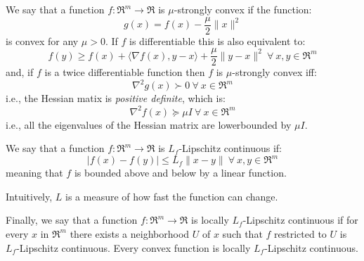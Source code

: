 
\begin{definition} \label{def:strong_convexity}
We say that a function $f: \Re^m \rightarrow \Re$ is $\mu$-strongly convex if the function:
$$
g(x) = f(x) - \frac{\mu}{2} \| x \|^2
$$
is convex for any $\mu > 0$. 
If $f$ is differentiable this is also equivalent to:
$$
f(y) \geq f(x) + \langle \nabla f(x), y - x \rangle + \frac{\mu}{2} \| y - x \|^2 \ \forall \ x, y \in \Re^m
$$
and, if $f$ is a twice differentiable function then $f$ is $\mu$-strongly convex iff:
$$
\nabla^2 g(x) \succ 0 \ \forall \ x \in \Re^m
$$
i.e., the Hessian matix is \emph{positive definite}, which is:
$$
\nabla^2 f(x) \succeq \mu I \ \forall \ x \in \Re^m
$$
i.e., all the eigenvalues of the Hessian matrix are lowerbounded by $\mu I$.
\end{definition}


\begin{definition} \label{def:l_f_lipschitz_continuity}
We say that a function $f: \Re^m \rightarrow \Re$ is $L_f$-Lipschitz continuous if:
$$
| f(x) - f(y) | \leq L_f \| x - y \| \ \forall \ x, y \in \Re^m
$$
meaning that $f$ is bounded above and below by a linear function.

Intuitively, $L$ is a measure of how fast the function can change.

Finally, we say that a function $f: \Re^m \rightarrow \Re$ is locally $L_f$-Lipschitz continuous if for every $x$ in $\Re^m$ there exists a neighborhood $U$ of $x$ such that $f$ restricted to $U$ is $L_f$-Lipschitz continuous.
Every convex function is locally $L_f$-Lipschitz continuous.
\end{definition}


